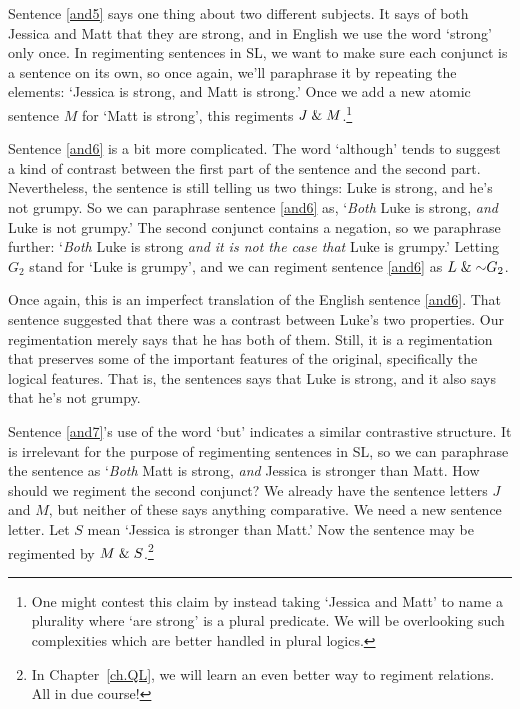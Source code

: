 Sentence \ref{and5} says one thing about two different subjects.
It says of both Jessica and Matt that they are strong, and in English we use the word `strong' only once.
In regimenting sentences in SL, we want to make sure each conjunct is a sentence on its own, so once again, we'll paraphrase it by repeating the elements: `Jessica is strong, and Matt is strong.'
Once we add a new atomic sentence $M$ for `Matt is strong', this regiments $J\mathrel\& M$.\footnote{One might contest this claim by instead taking `Jessica and Matt' to name a plurality where `are strong' is a plural predicate. We will be overlooking such complexities which are better handled in plural logics.}

Sentence \ref{and6} is a bit more complicated.
The word `although' tends to suggest a kind of contrast between the first part of the sentence and the second part.
Nevertheless, the sentence is still telling us two things: Luke is strong, and he's not grumpy.
So we can paraphrase sentence \ref{and6} as, `\emph{Both} Luke is strong, \emph{and} Luke is not grumpy.'
The second conjunct contains a negation, so we paraphrase further: `\emph{Both} Luke is strong \emph{and} \emph{it is not the case that} Luke is grumpy.'
Letting $G_{2}$ stand for `Luke is grumpy', and we can regiment sentence \ref{and6} as $L\eand\enot G_{2}$.

Once again, this is an imperfect translation of the English sentence \ref{and6}.
That sentence suggested that there was a contrast between Luke's two properties.
Our regimentation merely says that he has both of them.
Still, it is a regimentation that preserves some of the important features of the original, specifically the logical features.
That is, the sentences says that Luke is strong, and it also says that he's not grumpy.

Sentence \ref{and7}'s use of the word `but' indicates a similar contrastive structure.
It is irrelevant for the purpose of regimenting sentences in SL, so we can paraphrase the sentence as `\emph{Both} Matt is strong, \emph{and} Jessica is stronger than Matt.
How should we regiment the second conjunct? 
We already have the sentence letters $J$ and $M$, but neither of these says anything comparative.
We need a new sentence letter.
Let $S$ mean `Jessica is stronger than Matt.'
Now the sentence may be regimented by $M \mathrel\& S$.\footnote{In Chapter~\ref{ch.QL}, we will learn an even better way to regiment relations. All in due course!}


